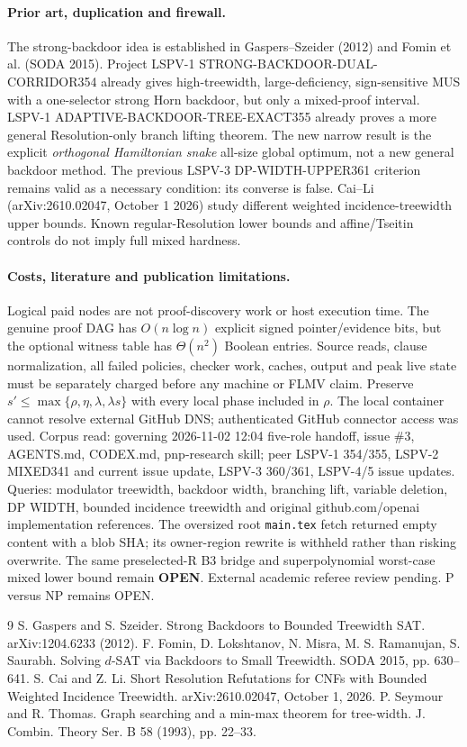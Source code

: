 \documentclass[11pt]{article}
\begin{document}
\paragraph{Prior art, duplication and firewall.}
The strong-backdoor idea is established in Gaspers--Szeider (2012) and Fomin et al. (SODA 2015). Project LSPV-1 STRONG-BACKDOOR-DUAL-CORRIDOR354 already gives high-treewidth, large-deficiency, sign-sensitive MUS with a one-selector strong Horn backdoor, but only a mixed-proof interval. LSPV-1 ADAPTIVE-BACKDOOR-TREE-EXACT355 already proves a more general Resolution-only branch lifting theorem. The new narrow result is the explicit \emph{orthogonal Hamiltonian snake} all-size global optimum, not a new general backdoor method. The previous LSPV-3 DP-WIDTH-UPPER361 criterion remains valid as a necessary condition: its converse is false. Cai--Li (arXiv:2610.02047, October 1 2026) study different weighted incidence-treewidth upper bounds. Known regular-Resolution lower bounds and affine/Tseitin controls do not imply full mixed hardness.

\paragraph{Costs, literature and publication limitations.}
Logical paid nodes are not proof-discovery work or host execution time. The genuine proof DAG has $O(n\log n)$ explicit signed pointer/evidence bits, but the optional witness table has $\Theta(n^2)$ Boolean entries. Source reads, clause normalization, all failed policies, checker work, caches, output and peak live state must be separately charged before any machine or FLMV claim. Preserve $s'\le\max\{\rho,\eta,\lambda,\lambda s\}$ with every local phase included in $\rho$. The local container cannot resolve external GitHub DNS; authenticated GitHub connector access was used. Corpus read: governing 2026-11-02 12:04 five-role handoff, issue \#3, AGENTS.md, CODEX.md, pnp-research skill; peer LSPV-1 354/355, LSPV-2 MIXED341 and current issue update, LSPV-3 360/361, LSPV-4/5 issue updates. Queries: modulator treewidth, backdoor width, branching lift, variable deletion, DP WIDTH, bounded incidence treewidth and original github.com/openai implementation references. The oversized root \texttt{main.tex} fetch returned empty content with a blob SHA; its owner-region rewrite is withheld rather than risking overwrite. The same preselected-R B3 bridge and superpolynomial worst-case mixed lower bound remain \textbf{OPEN}. External academic referee review pending. P versus NP remains OPEN.

\begin{thebibliography}{9}
 S. Gaspers and S. Szeider. Strong Backdoors to Bounded Treewidth SAT. arXiv:1204.6233 (2012).
 F. Fomin, D. Lokshtanov, N. Misra, M. S. Ramanujan, S. Saurabh. Solving $d$-SAT via Backdoors to Small Treewidth. SODA 2015, pp. 630--641.
 S. Cai and Z. Li. Short Resolution Refutations for CNFs with Bounded Weighted Incidence Treewidth. arXiv:2610.02047, October 1, 2026.
 P. Seymour and R. Thomas. Graph searching and a min-max theorem for tree-width. J. Combin. Theory Ser. B 58 (1993), pp. 22--33.
\end{thebibliography}
\end{document}
